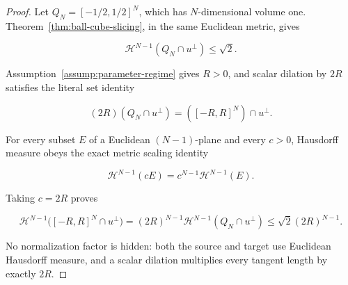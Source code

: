 \begin{proof}
Let \(Q_N=[-1/2,1/2]^N\), which has \(N\)-dimensional volume one. Theorem~\ref{thm:ball-cube-slicing}, in the same Euclidean metric, gives

\begin{equation}
\label{eq:appendix-display-160}
\mathcal H^{N-1}(Q_N\cap u^\perp)\leq\sqrt2.
\end{equation}

Assumption~\ref{assump:parameter-regime} gives \(R>0\), and scalar dilation by \(2R\) satisfies the literal set identity

\begin{equation}
\label{eq:appendix-display-161}
(2R)(Q_N\cap u^\perp)
=([-R,R]^N)\cap u^\perp.
\end{equation}

For every subset \(E\) of a Euclidean \((N-1)\)-plane and every \(c>0\), Hausdorff measure obeys the exact metric scaling identity

\begin{equation}
\label{eq:appendix-display-162}
\mathcal H^{N-1}(cE)=c^{N-1}\mathcal H^{N-1}(E).
\end{equation}

Taking \(c=2R\) proves

\begin{equation}
\label{eq:appendix-display-163}
\mathcal H^{N-1}\bigl([-R,R]^N\cap u^\perp\bigr)
=(2R)^{N-1}\mathcal H^{N-1}(Q_N\cap u^\perp)
\leq\sqrt2(2R)^{N-1}.
\end{equation}

No normalization factor is hidden: both the source and target use Euclidean Hausdorff measure, and a scalar dilation multiplies every tangent length by exactly \(2R\).
\end{proof}

